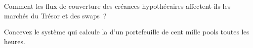 \begin{interviewq}\label{iq:m2:mortgages-and-agencies:5}
Comment les flux de couverture des créances hypothécaires affectent-ils les marchés du Trésor et des swaps~?
\end{interviewq}

\begin{interviewq}\label{iq:m2:mortgages-and-agencies:6}
Concevez le système qui calcule la  d'un portefeuille de cent
mille pools toutes les heures.
\end{interviewq}
